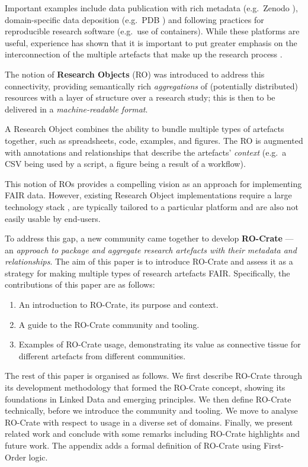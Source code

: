 Important examples include data publication with rich metadata
(e.g.~Zenodo \cite{Dillen 2019}),
domain-specific data deposition (e.g.~PDB
\cite{Berman 2007}) and following
practices for reproducible research software
\cite{ch5-101} (e.g.~use
of containers). While these platforms are useful, experience has shown
that it is important to put greater emphasis on the interconnection of
the multiple artefacts that make up the research process
\cite{ch5-71}.

The notion of \textbf{Research Objects}
\cite{Bechhofer 2013}
(RO) was introduced to address this connectivity, providing semantically
rich \emph{aggregations} of (potentially distributed) resources with a
layer of structure over a research study; this is then to be delivered
in a \emph{machine-readable format}.

A Research Object combines the ability to bundle multiple types of
artefacts together, such as spreadsheets, code, examples, and figures.
The RO is augmented with annotations and relationships that describe the
artefacts' \emph{context} (e.g.~a CSV being used by a script, a figure
being a result of a workflow).

This notion of ROs provides a compelling vision as an approach for
implementing FAIR data. However, existing Research Object
implementations require a large technology stack
\cite{Belhajjame 2015}, are
typically tailored to a particular platform and are also not easily
usable by end-users.

To address this gap, a new community came together
\cite{OCarragain 2019} to develop
\textbf{RO-Crate} --- an \emph{approach to package and aggregate
research artefacts with their metadata and relationships}. The aim of
this paper is to introduce RO-Crate and assess it as a strategy for
making multiple types of research artefacts FAIR. Specifically, the
contributions of this paper are as follows:

\begin{enumerate}
  \item An introduction to RO-Crate, its purpose and context.
  \item A guide to the RO-Crate community and tooling.
  \item Examples of RO-Crate usage, demonstrating its value as connective tissue for different artefacts from different communities.
\end{enumerate}

The rest of this paper is organised as follows. We first describe
RO-Crate through its development methodology that formed the RO-Crate
concept, showing its foundations in Linked Data and emerging principles.
We then define RO-Crate technically, before we introduce the community
and tooling. We move to analyse RO-Crate with respect to usage in a
diverse set of domains. Finally, we present related work and conclude
with some remarks including RO-Crate highlights and future work. The
appendix adds a formal definition of RO-Crate using First-Order logic.


